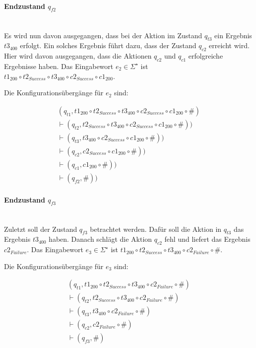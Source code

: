 \paragraph*{Endzustand $q_{f2}$} \mbox{}\\
Es wird nun davon ausgegangen, dass bei der Aktion im Zustand $q_{t3}$ ein Ergebnis $t3_{400}$ erfolgt. Ein solches Ergebnis führt dazu, dass der Zustand $q_{c2}$ erreicht wird. Hier wird davon ausgegangen, dass die Aktionen $q_{c2}$ und $q_{c1}$ erfolgreiche Ergebnisse haben. Das Eingabewort $e_2 \in \Sigma^{\star}$ ist $t1_{200} \circ t2_{Success} \circ t3_{400} \circ c2_{Success} \circ c1_{200}$.

Die Konfigurationsübergänge für $e_2$ sind:

\begin{align*}
	(q_{t1}, t1_{200} \circ t2_{Success} \circ t3_{400} \circ c2_{Success} \circ c1_{200} \circ \#)\\
	\vdash (q_{t2}, t2_{Success} \circ t3_{400} \circ c2_{Success} \circ c1_{200} \circ \#))\\
	\vdash (q_{t3}, t3_{400} \circ c2_{Success} \circ c1_{200} \circ \#))\\
	\vdash (q_{c2}, c2_{Success} \circ c1_{200} \circ \#))\\
	\vdash (q_{c1}, c1_{200} \circ \#))\\
	\vdash (q_{f2}, \#))
\end{align*}


\paragraph*{Endzustand $q_{f3}$} \mbox{}\\
Zuletzt soll der Zustand $q_{f3}$ betrachtet werden. Dafür soll die Aktion in $q_{t3}$ das Ergebnis $t3_{400}$ haben. Danach schlägt die Aktion $q_{c2}$ fehl und liefert das Ergebnis $c2_{Failure}$. Das Eingabewort $e_3 \in \Sigma^{\star}$ ist $t1_{200} \circ t2_{Success} \circ t3_{400} \circ c2_{Failure} \circ \#$.

Die Konfigurationsübergänge für $e_3$ sind:

\begin{align*}
	(q_{t1}, t1_{200} \circ t2_{Success} \circ t3_{400} \circ c2_{Failure} \circ \#) \\
	\vdash (q_{t2}, t2_{Success} \circ t3_{400} \circ c2_{Failure} \circ \#) \\
	\vdash (q_{t3}, t3_{400} \circ c2_{Failure} \circ \#) \\
	\vdash (q_{c2}, c2_{Failure} \circ \#) \\
	\vdash (q_{f3}, \#) \\
\end{align*}

